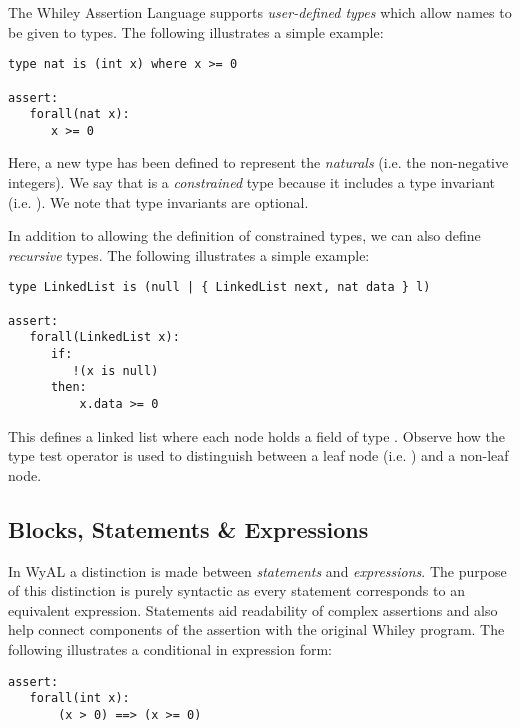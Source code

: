 The Whiley Assertion Language supports {\em user-defined types} which
allow names to be given to types.  The following illustrates a simple
example:
\begin{tcolorbox}\begin{lstlisting}[language=WyAL]
type nat is (int x) where x >= 0

assert:
   forall(nat x):
      x >= 0
\end{lstlisting}\end{tcolorbox}
Here, a new type  has been defined to represent the
{\em naturals} (i.e. the non-negative integers).  We say that
 is a {\em constrained} type because it includes a type
invariant (i.e. ).  We note that type invariants
are optional.

In addition to allowing the definition of constrained types, we can
also define {\em recursive} types.  The following illustrates a simple
example:

\begin{tcolorbox}\begin{lstlisting}[language=WyAL]
type LinkedList is (null | { LinkedList next, nat data } l)

assert:
   forall(LinkedList x):
      if:
         !(x is null)
      then:
          x.data >= 0
\end{lstlisting}\end{tcolorbox}
This defines a linked list where each node holds a field
 of type .  Observe how the type test
operator is used to distinguish between a leaf node
(i.e. ) and a non-leaf node.

\subsection{Blocks, Statements \& Expressions}


In WyAL a distinction is made between {\em statements} and {\em
  expressions}.  The purpose of this distinction is purely syntactic
as every statement corresponds to an equivalent expression.
Statements aid readability of complex assertions and also help
connect components of the assertion with the original Whiley program.
The following illustrates a conditional in expression form:

\begin{tcolorbox}\begin{lstlisting}[language=WyAL]
assert:
   forall(int x):
       (x > 0) ==> (x >= 0)
\end{lstlisting}\end{tcolorbox}

